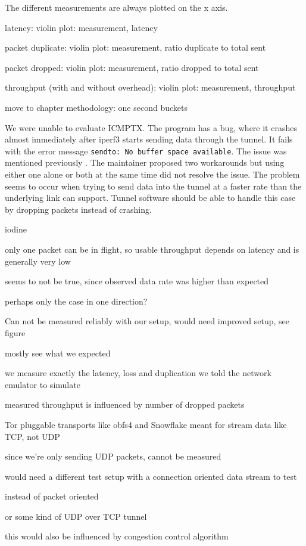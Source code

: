 The different measurements are always plotted on the x axis.

latency: violin plot: measurement, latency

packet duplicate: violin plot: measurement, ratio duplicate to total sent

packet dropped: violin plot: measurement, ratio dropped to total sent

throughput (with and without overhead): violin plot: measurement, throughput


move to chapter methodology:
one second buckets


We were unable to evaluate ICMPTX.
The program has a bug, where it crashes almost immediately after iperf3 starts sending data through the tunnel.
It fails with the error message \texttt{sendto: No buffer space available}.
The issue was mentioned previously \cite{icmptx-sendto-no-buffer-space-avaiable}.
The maintainer proposed two workarounds but using either one alone or both at the same time did not resolve the issue.
The problem seems to occur when trying to send data into the tunnel at a faster rate than the underlying link can support.
Tunnel software should be able to handle this case by dropping packets instead of crashing.


iodine

only one packet can be in flight, so usable throughput depends on latency and is generally very low

seems to not be true, since observed data rate was higher than expected

perhaps only the case in one direction?

Can not be measured reliably with our setup, would need improved setup, see figure



mostly see what we expected

we measure exactly the latency, loss and duplication we told the network emulator to simulate

measured throughput is influenced by number of dropped packets


Tor pluggable transports like obfs4 and Snowflake
meant for stream data like TCP, not UDP

since we're only sending UDP packets, cannot be measured

would need a different test setup with a connection oriented data stream to test

instead of packet oriented

or some kind of UDP over TCP tunnel

this would also be influenced by congestion control algorithm

